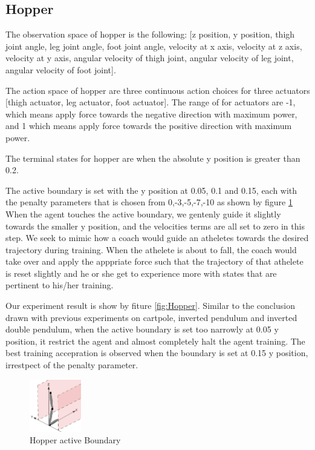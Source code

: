 \documentclass[journal]{IEEEtran}
\begin{document}
\subsection{Hopper}
The observation space of hopper is the following: [z position, y position, thigh joint angle, leg joint angle, foot joint angle, velocity at x axis, velocity at z axis, velocity at y axis, angular velocity of thigh joint, angular velocity of leg joint, angular velocity of foot joint].

The action space of hopper are three continuous action choices for three actuators [thigh actuator, leg actuator, foot actuator]. The range of for actuators are -1, which means apply force towards the negative direction with maximum power, and 1 which means apply force towards the positive direction with maximum power.

The terminal states for hopper are when the absolute y position is greater than 0.2.

The active boundary is set with the y position at 0.05, 0.1 and 0.15, each with the penalty parameters that is chosen from 0,-3,-5,-7,-10 as shown by figure \ref{fig:hopperPB} When the agent touches the active boundary, we gentenly guide it slightly towards the smaller y position, and the velocities terms are all set to zero in this step. We seek to mimic how a coach would guide an atheletes towards the desired trajectory during training. When the athelete is about to fall, the coach would take over and apply the apppriate force such that the trajectory of that athelete is reset slightly and he or she get to experience more with states that are pertinent to his/her training.

Our experiment result is show by fiture \ref{fig:Hopper}. Similar to the conclusion drawn with previous experiments on cartpole, inverted pendulum and inverted double pendulum, when the active boundary is set too narrowly at 0.05 y position, it restrict the agent and almost completely halt the agent training. The best training accepration is observed when the boundary is set at 0.15 y position, irrestpect of the penalty parameter.

\begin{figure}
     \centering
      \includegraphics[width=0.2\textwidth]{hopper.png}
      \caption{Hopper active Boundary}
      \label{fig:hopperPB}
\end{figure}
\end{document}
